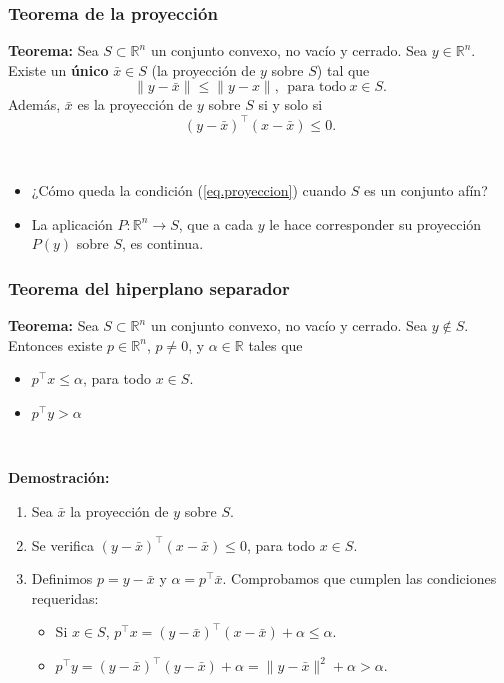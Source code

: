 \documentclass{beamer}
\begin{document}
\begin{frame}
\frametitle{Teorema de la proyección}

{\bf Teorema:}
 Sea $S\subset\mathbb{R}^n$ un conjunto convexo, no vacío y cerrado. Sea $y\in \mathbb{R}^n$. Existe un \textbf{único} $\bar x\in S$ (la proyección de $y$ sobre $S$) tal que 
\[
\|y-\bar x\| \leq \|y - x\|, \ \ \mbox{para todo}\ x\in S.
\]
Además, $\bar x$ es la proyección de $y$ sobre $S$ si y solo si
\begin{equation}
\label{eq.proyeccion}
(y-\bar x)^\top (x - \bar{x}) \leq 0.
\end{equation}


\

\begin{itemize}
\item ¿Cómo queda la condición (\ref{eq.proyeccion}) cuando $S$ es un conjunto afín?
\item La aplicación $P:\mathbb{R}^n\to S$, que a cada $y$ le hace corresponder su proyección $P(y)$ sobre $S$, es continua.
\end{itemize}

\end{frame}
\begin{frame}
\frametitle{Teorema del hiperplano separador}

{\bf Teorema:} Sea $S\subset\mathbb{R}^n$ un conjunto convexo, no vacío y cerrado. Sea $y\notin S$. Entonces existe $p\in\mathbb{R}^n$, $p\neq 0$, y $\alpha\in\mathbb{R}$ tales que
\begin{itemize}
\item $p^\top x\leq \alpha$, para todo $x\in S$.
\item $p^\top y > \alpha$ 
\end{itemize}

\

\textbf{Demostración:} 

\begin{enumerate}
\item Sea $\bar x$ la proyección de $y$ sobre $S$.

\item Se verifica $(y-\bar{x})^\top (x-\bar{x})\leq 0$,   para todo $x\in S$.

\item Definimos $p=y-\bar{x}$ y $\alpha=p^\top\bar{x}$. Comprobamos que cumplen las condiciones requeridas:
\begin{itemize}
\item Si $x\in S$, $p^\top x = (y-\bar{x})^\top (x-\bar{x}) + \alpha \leq \alpha$.
\item $p^\top y = (y-\bar{x})^\top (y-\bar{x}) + \alpha =\|y-\bar x\|^2 +\alpha > \alpha$.
\end{itemize}

\end{enumerate}



\end{frame}
\end{document}
